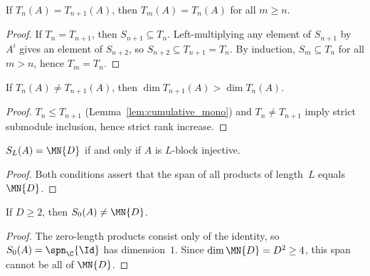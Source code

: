 \begin{theorem}\label{thm:cumulative_stable}
    \leanok
    If $T_n(A) = T_{n+1}(A)$, then $T_m(A) = T_n(A)$
    for all $m \ge n$.
\end{theorem}

\begin{proof}
    \leanok
    If $T_n = T_{n+1}$, then $S_{n+1} \subseteq T_n$.
    Left-multiplying any element of $S_{n+1}$ by $A^i$ gives
    an element of $S_{n+2}$, so $S_{n+2} \subseteq T_{n+1} = T_n$.
    By induction, $S_m \subseteq T_n$ for all $m > n$,
    hence $T_m = T_n$.
\end{proof}

\begin{theorem}\label{thm:cumulative_strict_mono}
    \leanok
    If $T_n(A) \neq T_{n+1}(A)$, then
    $\dim T_{n+1}(A) > \dim T_n(A)$.
\end{theorem}

\begin{proof}
    \leanok
    $T_n \le T_{n+1}$ (Lemma~\ref{lem:cumulative_mono})
    and $T_n \neq T_{n+1}$
    imply strict submodule inclusion, hence strict rank increase.
\end{proof}

\begin{lemma}\label{lem:wordspan_blk_inj}
    \leanok
    $S_L(A) = \MN{D}$ if and only if $A$ is $L$-block injective.
\end{lemma}

\begin{proof}\leanok{}
    Both conditions assert that the span of all products of
    length~$L$ equals $\MN{D}$.
\end{proof}

\begin{lemma}
    \label{lem:wordspan_zero_ne_top}
    \leanok
    If $D \ge 2$, then $S_0(A) \ne \MN{D}$.
\end{lemma}

\begin{proof}\leanok{}
    The zero-length products consist only of the identity, so
    $S_0(A)=\spn_{\C}\{\Id\}$ has dimension~$1$. Since
    $\dim \MN{D}=D^2 \ge 4$, this span cannot be all of $\MN{D}$.
\end{proof}

